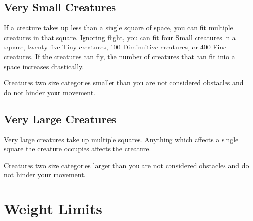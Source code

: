     \subsection{Very Small Creatures}
         If a creature takes up less than a single square of space, you can fit multiple creatures in that square.
        Ignoring flight, you can fit four Small creatures in a square, twenty-five Tiny creatures, 100 Diminuitive creatures, or 400 Fine creatures.
        If the creatures can fly, the number of creatures that can fit into a space increases drastically.

         Creatures two size categories smaller than you are not considered obstacles and do not hinder your movement.

    \subsection{Very Large Creatures}\label{Very Large Creatures}
         Very large creatures take up multiple squares. Anything which affects a single square the creature occupies affects the creature.

         Creatures two size categories larger than you are not considered obstacles and do not hinder your movement.

\section{Weight Limits}\label{Weight Limits}

